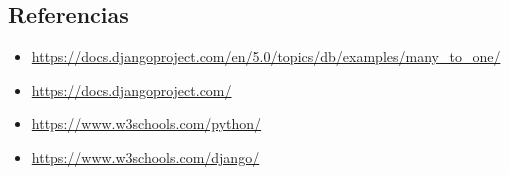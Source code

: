 \documentclass{article}
\begin{document}
\begin{itemize}
\clearpage

\section{Referencias}
\begin{itemize}			
	\item \url{https://docs.djangoproject.com/en/5.0/topics/db/examples/many\_to\_one/}
	\item \url{https://docs.djangoproject.com/}
	\item \url{https://www.w3schools.com/python/}
	\item \url{https://www.w3schools.com/django/}

\end{itemize}
\end{itemize}	
	
%
%
%
			
\end{document}
